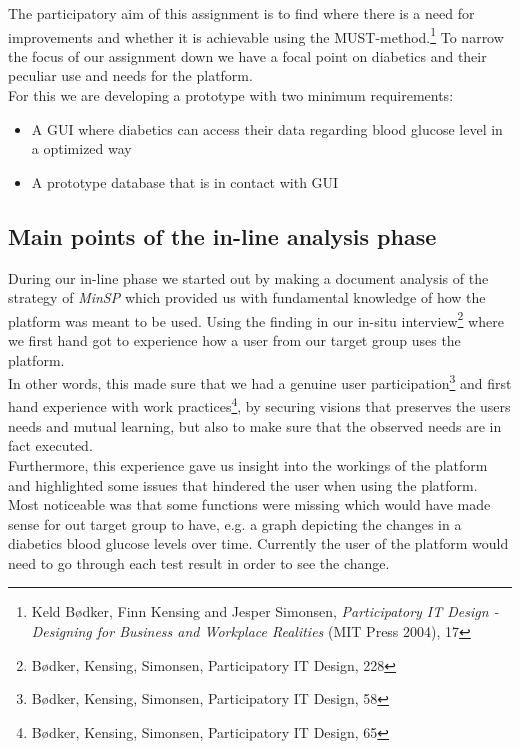 \documentclass[a4paper,11pt]{article}
\begin{document}
The participatory aim of this assignment is to find where there is a need for improvements and whether it is achievable using the MUST-method.\footnote{Keld Bødker, Finn Kensing and Jesper Simonsen, \textit{Participatory IT Design - Designing for Business and Workplace Realities} (MIT Press 2004), 17}
To narrow the focus of our assignment down we have a focal point on diabetics and their peculiar use and needs for the platform.\\

For this we are developing a prototype with two minimum requirements:
\begin{itemize}
    \item A GUI where diabetics can access their data regarding blood glucose level in a optimized way
    \item A prototype database that is in contact with GUI
\end{itemize}


\subsection{Main points of the in-line analysis phase}
During our in-line phase we started out by making a document analysis of the strategy of \textit{MinSP} which provided us with fundamental knowledge of how the platform was meant to be used. Using the finding in our in-situ interview\footnote{Bødker, Kensing, Simonsen, Participatory IT Design, 228} where we first hand got to experience how a user from our target group uses the platform.\\ In other words, this made sure that we had a genuine user participation\footnote{Bødker, Kensing, Simonsen, Participatory IT Design, 58} and first hand experience with work practices\footnote{Bødker, Kensing, Simonsen, Participatory IT Design, 65}, by securing visions that preserves the users needs and mutual learning, but also to make sure that the observed needs are in fact executed.\\

Furthermore, this experience gave us insight into the workings of the platform and highlighted some issues that hindered the user when using the platform. Most noticeable was that some functions were missing which would have made sense for out target group to have, e.g. a graph depicting the changes in a diabetics blood glucose levels over time. Currently the user of the platform would need to go through each test result in order to see the change.\\
\end{document}
